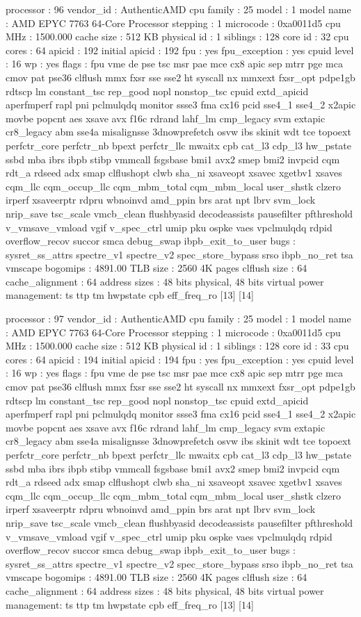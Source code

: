 processor	: 96
vendor_id	: AuthenticAMD
cpu family	: 25
model		: 1
model name	: AMD EPYC 7763 64-Core Processor
stepping	: 1
microcode	: 0xa0011d5
cpu MHz		: 1500.000
cache size	: 512 KB
physical id	: 1
siblings	: 128
core id		: 32
cpu cores	: 64
apicid		: 192
initial apicid	: 192
fpu		: yes
fpu_exception	: yes
cpuid level	: 16
wp		: yes
flags		: fpu vme de pse tsc msr pae mce cx8 apic sep mtrr pge mca cmov pat pse36 clflush mmx fxsr sse sse2 ht syscall nx mmxext fxsr_opt pdpe1gb rdtscp lm constant_tsc rep_good nopl nonstop_tsc cpuid extd_apicid aperfmperf rapl pni pclmulqdq monitor ssse3 fma cx16 pcid sse4_1 sse4_2 x2apic movbe popcnt aes xsave avx f16c rdrand lahf_lm cmp_legacy svm extapic cr8_legacy abm sse4a misalignsse 3dnowprefetch osvw ibs skinit wdt tce topoext perfctr_core perfctr_nb bpext perfctr_llc mwaitx cpb cat_l3 cdp_l3 hw_pstate ssbd mba ibrs ibpb stibp vmmcall fsgsbase bmi1 avx2 smep bmi2 invpcid cqm rdt_a rdseed adx smap clflushopt clwb sha_ni xsaveopt xsavec xgetbv1 xsaves cqm_llc cqm_occup_llc cqm_mbm_total cqm_mbm_local user_shstk clzero irperf xsaveerptr rdpru wbnoinvd amd_ppin brs arat npt lbrv svm_lock nrip_save tsc_scale vmcb_clean flushbyasid decodeassists pausefilter pfthreshold v_vmsave_vmload vgif v_spec_ctrl umip pku ospke vaes vpclmulqdq rdpid overflow_recov succor smca debug_swap ibpb_exit_to_user
bugs		: sysret_ss_attrs spectre_v1 spectre_v2 spec_store_bypass srso ibpb_no_ret tsa vmscape
bogomips	: 4891.00
TLB size	: 2560 4K pages
clflush size	: 64
cache_alignment	: 64
address sizes	: 48 bits physical, 48 bits virtual
power management: ts ttp tm hwpstate cpb eff_freq_ro [13] [14]

processor	: 97
vendor_id	: AuthenticAMD
cpu family	: 25
model		: 1
model name	: AMD EPYC 7763 64-Core Processor
stepping	: 1
microcode	: 0xa0011d5
cpu MHz		: 1500.000
cache size	: 512 KB
physical id	: 1
siblings	: 128
core id		: 33
cpu cores	: 64
apicid		: 194
initial apicid	: 194
fpu		: yes
fpu_exception	: yes
cpuid level	: 16
wp		: yes
flags		: fpu vme de pse tsc msr pae mce cx8 apic sep mtrr pge mca cmov pat pse36 clflush mmx fxsr sse sse2 ht syscall nx mmxext fxsr_opt pdpe1gb rdtscp lm constant_tsc rep_good nopl nonstop_tsc cpuid extd_apicid aperfmperf rapl pni pclmulqdq monitor ssse3 fma cx16 pcid sse4_1 sse4_2 x2apic movbe popcnt aes xsave avx f16c rdrand lahf_lm cmp_legacy svm extapic cr8_legacy abm sse4a misalignsse 3dnowprefetch osvw ibs skinit wdt tce topoext perfctr_core perfctr_nb bpext perfctr_llc mwaitx cpb cat_l3 cdp_l3 hw_pstate ssbd mba ibrs ibpb stibp vmmcall fsgsbase bmi1 avx2 smep bmi2 invpcid cqm rdt_a rdseed adx smap clflushopt clwb sha_ni xsaveopt xsavec xgetbv1 xsaves cqm_llc cqm_occup_llc cqm_mbm_total cqm_mbm_local user_shstk clzero irperf xsaveerptr rdpru wbnoinvd amd_ppin brs arat npt lbrv svm_lock nrip_save tsc_scale vmcb_clean flushbyasid decodeassists pausefilter pfthreshold v_vmsave_vmload vgif v_spec_ctrl umip pku ospke vaes vpclmulqdq rdpid overflow_recov succor smca debug_swap ibpb_exit_to_user
bugs		: sysret_ss_attrs spectre_v1 spectre_v2 spec_store_bypass srso ibpb_no_ret tsa vmscape
bogomips	: 4891.00
TLB size	: 2560 4K pages
clflush size	: 64
cache_alignment	: 64
address sizes	: 48 bits physical, 48 bits virtual
power management: ts ttp tm hwpstate cpb eff_freq_ro [13] [14]

